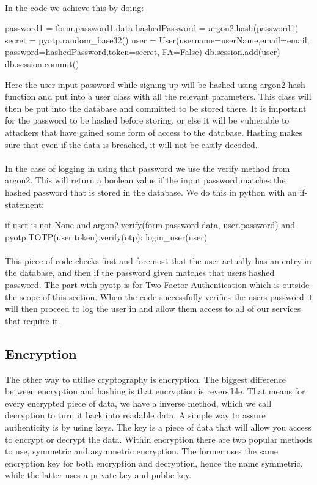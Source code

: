 \paragraph{}
In the code we achieve this by doing:

\begin{python}
password1 = form.password1.data
hashedPassword = argon2.hash(password1)
secret = pyotp.random_base32()
user = User(username=userName,email=email,
    password=hashedPassword,token=secret, FA=False)
db.session.add(user)
db.session.commit()
\end{python}

Here the user input password while signing up will be hashed using argon2 hash function and put into a user class with all the relevant parameters. This class will then be put into the database and committed to be stored there. It is important for the password to be hashed before storing, or else it will be vulnerable to attackers that have gained some form of access to the database. Hashing makes sure that even if the data is breached, it will not be easily decoded. 
\paragraph{}
In the case of logging in using that password we use the verify method from argon2. This will return a boolean value if the input password matches the hashed password that is stored in the database. We do this in python with an if-statement: 
\begin{python}
if user is not None and argon2.verify(form.password.data, 
            user.password) and pyotp.TOTP(user.token).verify(otp):
    login_user(user)
\end{python}
\paragraph{}
This piece of code checks first and foremost that the user actually has an entry in the database, and then if the password given matches that users hashed password. The part with pyotp is for Two-Factor Authentication which is outside the scope of this section. When the code successfully verifies the users password it will then proceed to log the user in and allow them access to all of our services that require it.

\subsection{Encryption}
The other way to utilise cryptography is encryption. The biggest difference between encryption and hashing is that encryption is reversible. That means for every encrypted piece of data, we have a inverse method, which we call decryption to turn it back into readable data. A simple way to assure authenticity is by using keys. The key is a piece of data that will allow you access to encrypt or decrypt the data. Within encryption there are two popular methods to use, symmetric and asymmetric encryption. The former uses the same encryption key for both encryption and decryption, hence the name symmetric, while the latter uses a private key and public key.
